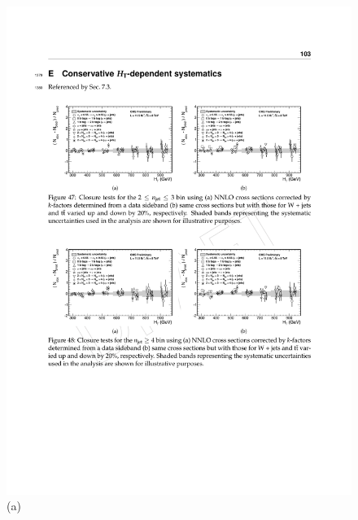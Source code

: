 \begin{figure}[ht]
\centering
\begin{minipage}[b]{0.48 \linewidth}
\includegraphics[width = 1.0\linewidth]{plots/syst-ge4j_nominal.pdf}
\centering
(a)  
\end{minipage}
\quad
\begin{minipage}[b]{0.48\linewidth}

\end{minipage}
\end{figure}
